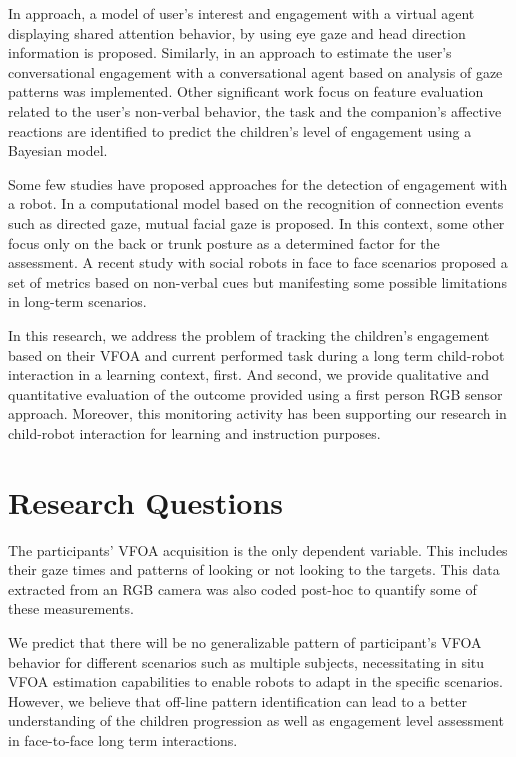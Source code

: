 \documentclass{sig-alternate}
\begin{document}
In \cite{peters2010investigating} approach, a model of user's interest and engagement with a virtual agent displaying shared attention behavior, by using eye gaze and head direction information is proposed. Similarly, in \cite{nakano2010estimating} an approach to estimate the user's conversational engagement with a conversational agent based on analysis of gaze patterns was implemented. Other significant work \cite{Castellano:2009} focus on feature evaluation related to the user's non-verbal behavior, the task and the companion's affective reactions are identified to predict the children's level of engagement using a Bayesian model.

Some few studies have proposed approaches for the detection of engagement with a robot. In \cite{Rich:2010} a computational model based on the recognition of connection events such
as directed gaze, mutual facial gaze is proposed. In this context, some other \cite{Sanghvi:2011} focus only on the back or trunk posture as a determined factor for the assessment. A recent study \cite{anzalone} with social robots in face to face scenarios proposed a set of metrics based on non-verbal cues but manifesting some possible limitations in long-term scenarios.

In this research, we address the problem of tracking the children's engagement based on their VFOA and current performed task during a long term child-robot interaction in a learning context, first. And second, we provide qualitative and quantitative evaluation of the outcome provided using a first person RGB sensor approach. Moreover, this monitoring activity has been supporting our research in child-robot interaction for learning and instruction purposes.
\vfill


\section{Research Questions}

The participants' VFOA acquisition is the only dependent variable. This includes their gaze times and patterns of looking or not looking to the targets. This data extracted from an RGB camera was also coded post-hoc to quantify some of these measurements.

We predict that there will be no generalizable pattern of participant's VFOA behavior for different scenarios such as multiple subjects, necessitating in situ VFOA estimation capabilities to enable robots to adapt in the specific scenarios. However, we believe that off-line pattern identification can lead to a better understanding of the children progression as well as engagement level assessment in face-to-face long term interactions.
\end{document}
